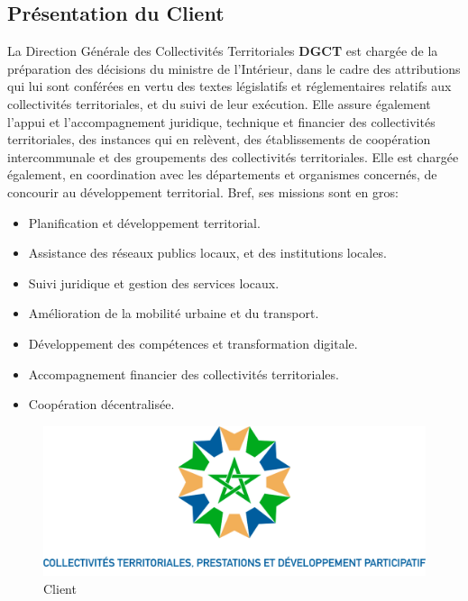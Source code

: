 \documentclass[a4paper]{report}
\begin{document}
\begin{doublespace}
    \section{Présentation du Client}
    La Direction Générale des Collectivités Territoriales \textbf{DGCT} est
    chargée de la préparation des décisions du ministre de l’Intérieur,
    dans le cadre des attributions qui lui sont conférées en vertu des textes
    législatifs et réglementaires relatifs aux collectivités
    territoriales, et du suivi de leur exécution. Elle assure également l’appui
    et l'accompagnement juridique, technique et financier
    des collectivités territoriales, des instances qui en relèvent, des
    établissements de coopération intercommunale et des groupements
    des collectivités territoriales. Elle est chargée également, en
    coordination avec les départements et organismes concernés, de
    concourir au développement territorial. Bref, ses missions sont en gros:
    \begin{itemize}
        \item Planification et développement territorial.
        \item Assistance des réseaux publics locaux, et des institutions
              locales.
        \item Suivi juridique et gestion des services locaux.
        \item Amélioration de la mobilité urbaine et du transport.
        \item Développement des compétences et transformation digitale.
        \item Accompagnement financier des collectivités territoriales.
        \item Coopération décentralisée.
    \end{itemize}
    \begin{figure}[H]
        \begin{center}
            \includegraphics[scale=0.27]{images/logo-fr.png}
            \caption{Client}
        \end{center}
    \end{figure}
    \newpage

\end{doublespace}
\end{document}
